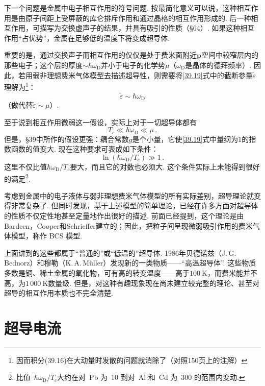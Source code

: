 下一个问题是金属中电子相互作用的符号问题. 按最简化意义可以说，这种相互作用是由原子间距上受屏蔽的库仑排斥作用和通过晶格的相互作用形成的. 后一种相互作用，可描写为交换虚声子的结果，并具有吸引的性质（§64）. 如果这种相互作用“占优势”，金属在足够低的温度下将变成超导体.

重要的是，通过交换声子而相互作用的仅仅是处于费米面附近$\bm p$空间中较窄层内的那些电子；这个层的厚度$\sim\hbar\omega_{\mathrm D}$并小于电子的化学势$\mu$（$\omega_{\mathrm D}$是晶体的德拜频率）. 因此，若用弱非理想费米气体模型去描述超导性，则需要将\eqref{39.19}式中的截断参量$\tilde\varepsilon$理解为\footnote{因而积分(39.16)在大动量时发散的问题就消除了（对照150页上的注解）}：
\begin{equation}
\tilde\varepsilon\sim\hbar\omega_{\mathrm D}
\label{43.1}
\end{equation}
（做代替$\tilde\varepsilon\sim\mu$）.

至于说到相互作用微弱这一假设，实际上对于一切超导体都有
\begin{equation}
T_c\ll\hbar\omega_{\mathrm D}\ll\mu\,.
\label{43.2}
\end{equation}
但是，§39中所作的假设更强：耦合常数$g$是个小量，它使\eqref{39.19}式中量纲为1的指数函数的值变大. 现在这种要求可表成如下条件：
\begin{equation}
\ln(\hbar\omega_{\mathrm D}/T_c)\gg1\,.
\label{43.3}
\end{equation}
这里不仅比值$\hbar\omega_{\mathrm D}/T_c$要大，而且它的对数也必须大. 这个条件实际上未能得到很好的满足\footnote{比值~$\hbar\omega_{\mathrm D}/T_c$大约在对~Pb 为~10 到对~Al 和~Cd 为~300 的范围内变动.}.

考虑到金属中的电子液体与弱非理想费米气体模型的所有实际差别，超导理论就变得非常复杂了. 但同时发现，基于上述模型的简单理论，已经在许多方面对超导体的性质不仅定性地甚至定量地作出很好的描述. 前面已经提到，这个理论是由Bardeen，Cooper和Schrieffer建立的；因此，把粒子间呈现微弱吸引作用的费米气体模型，称作 BCS 模型.

上面讲到的这些都属于“普通的”或“低温的”超导体. 1986年贝德诺兹（J.\,G.\,Bednorz）和穆勒（K.\,A.\,M\"uller）发现新的一类物质——“高温超导体”. 这些物质多数是铜、稀土金属的氧化物，可有高的转变温度——高于$100\ \mathrm K$，而费米能并不高，为$1\,000\ \mathrm K$数量级. 但是，对这种有趣现象现在尚未建立较完整的理论、甚至对超导的相互作用本质也不完全清楚.

\section{超导电流}

